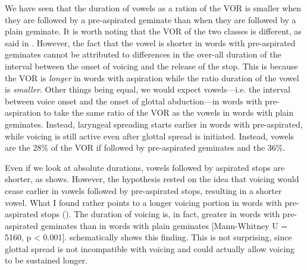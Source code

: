 \documentclass[11pt,a4paper,openany]{memoir}\usepackage[]{graphicx}\usepackage[]{color}
\begin{document}
We have seen that the duration of vowels as a ration of the VOR is smaller when they are followed by a pre-aspirated geminate than when they are followed by a plain geminate.
It is worth noting that the VOR of the two classes is different, as said in .
However, the fact that the vowel is shorter in words with pre-aspirated geminates cannot be attributed to differences in the over-all duration of the interval between the onset of voicing and the release of the stop.
This is because the VOR is \textit{longer} in words with aspiration while the ratio duration of the vowel is \textit{smaller}.
Other things being equal, we would expect vowels---i.e. the interval between voice onset and the onset of glottal abduction---in words with pre-aspiration to take the same ratio of the VOR as the vowels in words with plain geminates.
Instead, laryngeal spreading starts earlier in words with pre-aspirated, while voicing is still active even after glottal spread is initiated.
Instead, vowels are the 28\% of the VOR if followed by pre-aspirated geminates and the 36\%.




Even if we look at absolute durations, vowels followed by aspirated stops are shorter, as  shows.
However, the hypothesis rested on the idea that voicing would cease earlier in vowels followed by pre-aspirated stops, resulting in a shorter vowel.
What I found rather points to a longer voicing portion in words with pre-aspirated stops ().
The duration of voicing is, in fact, greater in words with pre-aspirated geminates than in words with plain geminates [Mann-Whitney U = 5160, p < 0.001].
 schematically shows this finding.
This is not surprising, since glottal spread is not incompatible with voicing and could actually allow voicing to be sustained longer.
\end{document}
